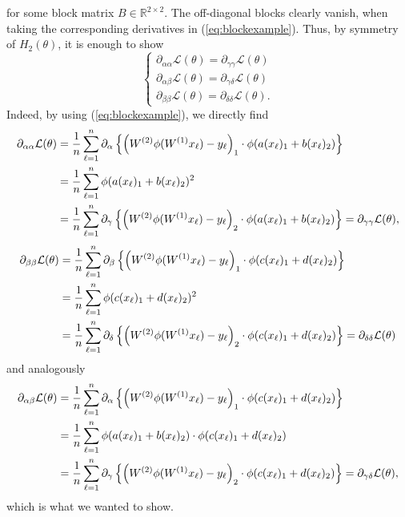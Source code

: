 \documentclass{article}
\begin{document}
for some block matrix $B\in\mathbb{R}^{2\times 2}$. The off-diagonal blocks clearly vanish, when taking the corresponding derivatives in (\ref{eq:blockexample}). Thus, by symmetry of $H_2(\theta)$, it is enough to show
\begin{equation}
\begin{cases}
\partial_{\alpha\alpha}\mathcal{L}(\theta)=\partial_{\gamma\gamma}\mathcal{L}(\theta) \\ \partial_{\alpha\beta}\mathcal{L}(\theta)=\partial_{\gamma\delta}\mathcal{L}(\theta) \\ \partial_{\beta\beta}\mathcal{L}(\theta)=\partial_{\delta\delta}\mathcal{L}(\theta).
\end{cases}
\end{equation}
Indeed, by using (\ref{eq:blockexample}), we directly find
\begin{align}
\partial_{\alpha\alpha}\mathcal{L}(\theta) &= \frac{1}{n}\sum_{\ell=1}^n\partial_\alpha\left\{\left(W^{(2)}\phi(W^{(1)}x_\ell)-y_\ell\right)_1\cdot\phi(a(x_\ell)_1+b(x_\ell)_2)\right\} \notag
\\ &=\frac{1}{n}\sum_{\ell=1}^n\phi(a(x_\ell)_1+b(x_\ell)_2)^2 \notag
\\ &= \frac{1}{n}\sum_{\ell=1}^n\partial_\gamma\left\{\left(W^{(2)}\phi(W^{(1)}x_\ell)-y_\ell\right)_2\cdot\phi(a(x_\ell)_1+b(x_\ell)_2)\right\}=\partial_{\gamma\gamma}\mathcal{L}(\theta),
\end{align}
\begin{align}
\partial_{\beta\beta}\mathcal{L}(\theta) &= \frac{1}{n}\sum_{\ell=1}^n\partial_\beta\left\{\left(W^{(2)}\phi(W^{(1)}x_\ell)-y_\ell\right)_1\cdot\phi(c(x_\ell)_1+d(x_\ell)_2)\right\} \notag
\\ &= \frac{1}{n}\sum_{\ell=1}^n\phi(c(x_\ell)_1+d(x_\ell)_2)^2 \notag
\\ &= \frac{1}{n}\sum_{\ell=1}^n\partial_\delta\left\{\left(W^{(2)}\phi(W^{(1)}x_\ell)-y_\ell\right)_2\cdot\phi(c(x_\ell)_1+d(x_\ell)_2)\right\} = \partial_{\delta\delta}\mathcal{L}(\theta)
\end{align}
and analogously
\begin{align}
\partial_{\alpha\beta}\mathcal{L}(\theta) &= \frac{1}{n}\sum_{\ell=1}^n\partial_\alpha\left\{\left(W^{(2)}\phi(W^{(1)}x_\ell)-y_\ell\right)_1\cdot\phi(c(x_\ell)_1+d(x_\ell)_2)\right\} \notag
\\ &= \frac{1}{n}\sum_{\ell=1}^n\phi(a(x_\ell)_1+b(x_\ell)_2)\cdot\phi(c(x_\ell)_1+d(x_\ell)_2) \notag
\\ &=\frac{1}{n}\sum_{\ell=1}^n\partial_\gamma\left\{\left(W^{(2)}\phi(W^{(1)}x_\ell)-y_\ell\right)_2\cdot\phi(c(x_\ell)_1+d(x_\ell)_2)\right\} =\partial_{\gamma\delta}\mathcal{L}(\theta),
\end{align}
which is what we wanted to show.
\end{document}
